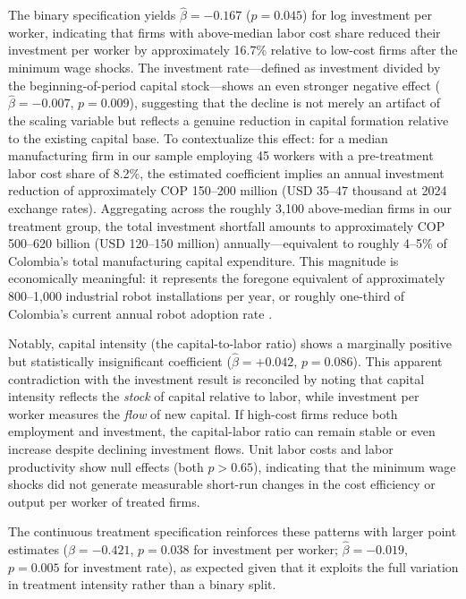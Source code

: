 \documentclass[5p,times,authoryear]{elsarticle}
\begin{document}
The binary specification yields $\hat{\beta} = -0.167$ ($p = 0.045$) for log investment per worker, indicating that firms with above-median labor cost share reduced their investment per worker by approximately 16.7\% relative to low-cost firms after the minimum wage shocks. The investment rate---defined as investment divided by the beginning-of-period capital stock---shows an even stronger negative effect ($\hat{\beta} = -0.007$, $p = 0.009$), suggesting that the decline is not merely an artifact of the scaling variable but reflects a genuine reduction in capital formation relative to the existing capital base. To contextualize this effect: for a median manufacturing firm in our sample employing 45 workers with a pre-treatment labor cost share of 8.2\%, the estimated coefficient implies an annual investment reduction of approximately COP 150--200 million (USD 35--47 thousand at 2024 exchange rates). Aggregating across the roughly 3,100 above-median firms in our treatment group, the total investment shortfall amounts to approximately COP 500--620 billion (USD 120--150 million) annually---equivalent to roughly 4--5\% of Colombia's total manufacturing capital expenditure. This magnitude is economically meaningful: it represents the foregone equivalent of approximately 800--1,000 industrial robot installations per year, or roughly one-third of Colombia's current annual robot adoption rate \citep{ifr2024}.

Notably, capital intensity (the capital-to-labor ratio) shows a marginally positive but statistically insignificant coefficient ($\hat{\beta} = +0.042$, $p = 0.086$). This apparent contradiction with the investment result is reconciled by noting that capital intensity reflects the \emph{stock} of capital relative to labor, while investment per worker measures the \emph{flow} of new capital. If high-cost firms reduce both employment and investment, the capital-labor ratio can remain stable or even increase despite declining investment flows. Unit labor costs and labor productivity show null effects (both $p > 0.65$), indicating that the minimum wage shocks did not generate measurable short-run changes in the cost efficiency or output per worker of treated firms.

The continuous treatment specification reinforces these patterns with larger point estimates ($\hat{\beta} = -0.421$, $p = 0.038$ for investment per worker; $\hat{\beta} = -0.019$, $p = 0.005$ for investment rate), as expected given that it exploits the full variation in treatment intensity rather than a binary split.
\end{document}

